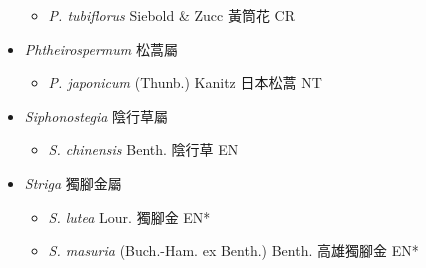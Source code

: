 \begin{itemize}
  \begin{itemize}
        \item[] \textit{P. tubiflorus} Siebold \& Zucc  黃筒花   CR
  \end{itemize}
 \item[] \textit{Phtheirospermum} 松蒿屬
                                
  \begin{itemize}
        \item[] \textit{P. japonicum} (Thunb.) Kanitz  日本松蒿   NT
  \end{itemize}
 \item[] \textit{Siphonostegia} 陰行草屬
                                
  \begin{itemize}
        \item[] \textit{S. chinensis} Benth.  陰行草   EN
  \end{itemize}
 \item[] \textit{Striga} 獨腳金屬
                                
  \begin{itemize}
        \item[] \textit{S. lutea} Lour.  獨腳金   EN*
        \item[] \textit{S. masuria} (Buch.-Ham. ex Benth.) Benth.  高雄獨腳金   EN*
  \end{itemize}
  \end{itemize}
